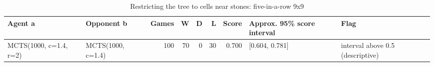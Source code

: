 \begin{table}[!t]
\centering
\caption{Restricting the tree to cells near stones: five-in-a-row 9x9}
\label{tab:radius_gomoku9}
\small
\begin{tabular}{llrrrrrll}
\toprule
Agent a & Opponent b & Games & W & D & L & Score & Approx. 95\% score interval & Flag \\
\midrule
MCTS(1000, c=1.4, r=2) & MCTS(1000, c=1.4) & 100 & 70 & 0 & 30 & 0.700 & [0.604, 0.781] & interval above 0.5 (descriptive) \\
\bottomrule
\end{tabular}
\end{table}
